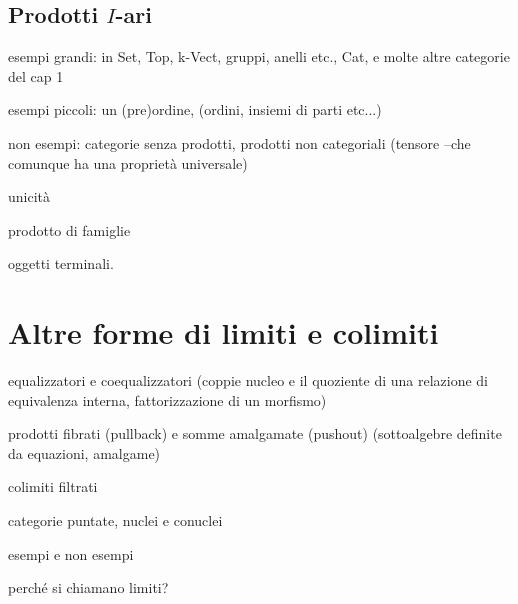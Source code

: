 \subsection{Prodotti \(I\)-ari}



\bigskip
esempi grandi: in Set, Top, k-Vect, gruppi, anelli etc., Cat, e molte altre categorie del cap 1

esempi piccoli: un (pre)ordine, (ordini, insiemi di parti etc...)

non esempi: categorie senza prodotti, prodotti non categoriali (tensore --che comunque ha una proprietà universale)

unicità

prodotto di famiglie

oggetti terminali.


\begin{esercizi}
	\item
	\item
	\item
	\item
	\item
\end{esercizi}
\section{Altre forme di limiti e colimiti}

equalizzatori e coequalizzatori (coppie nucleo e il quoziente di una relazione di equivalenza interna, fattorizzazione di un morfismo)

prodotti fibrati (pullback) e somme amalgamate (pushout) (sottoalgebre definite da equazioni, amalgame)

colimiti filtrati

categorie puntate, nuclei e conuclei

esempi e non esempi

perché si chiamano limiti?
\begin{remark}
\end{remark}
